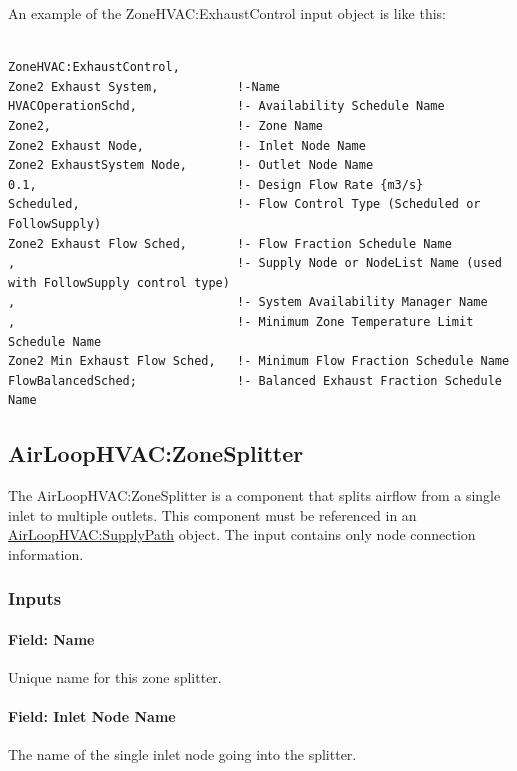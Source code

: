 An example of the ZoneHVAC:ExhaustControl input object is like this:

\begin{lstlisting}

ZoneHVAC:ExhaustControl,
Zone2 Exhaust System,           !-Name
HVACOperationSchd,              !- Availability Schedule Name
Zone2,                          !- Zone Name
Zone2 Exhaust Node,             !- Inlet Node Name
Zone2 ExhaustSystem Node,       !- Outlet Node Name
0.1,                            !- Design Flow Rate {m3/s}
Scheduled,                      !- Flow Control Type (Scheduled or FollowSupply)
Zone2 Exhaust Flow Sched,       !- Flow Fraction Schedule Name
,                               !- Supply Node or NodeList Name (used with FollowSupply control type)
,                               !- System Availability Manager Name
,                               !- Minimum Zone Temperature Limit Schedule Name
Zone2 Min Exhaust Flow Sched,   !- Minimum Flow Fraction Schedule Name
FlowBalancedSched;              !- Balanced Exhaust Fraction Schedule Name

\end{lstlisting}

\subsection{AirLoopHVAC:ZoneSplitter}\label{airloophvaczonesplitter}

The AirLoopHVAC:ZoneSplitter is a component that splits airflow from a single inlet to multiple outlets. This component must be referenced in an \hyperref[airloophvacsupplypath]{AirLoopHVAC:SupplyPath} object. The input contains only node connection information.

\subsubsection{Inputs}

\paragraph{Field: Name}

Unique name for this zone splitter.

\paragraph{Field: Inlet Node Name}

The name of the single inlet node going into the splitter.

